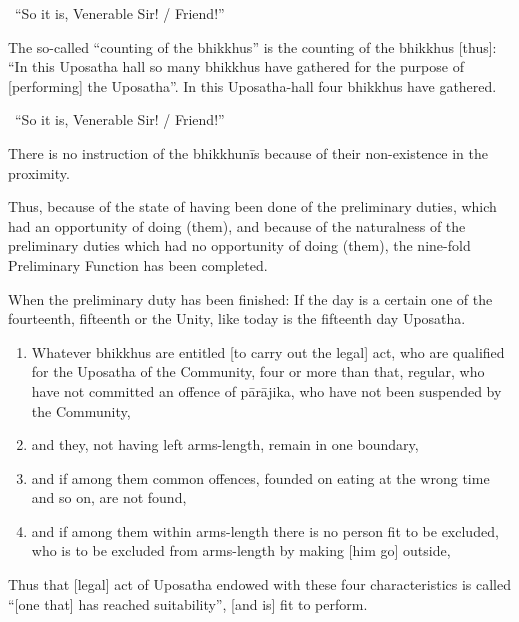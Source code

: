\begin{center}
  \anglebracketleft\ \hspace{-0.5mm}``So it is, Venerable Sir! / Friend!'' \hspace{-0.5mm}\anglebracketright\
\end{center}

The so-called ``counting of the bhikkhus'' is the counting of the bhikkhus [thus]: ``In this Uposatha hall so many bhikkhus have gathered for the purpose of [performing] the Uposatha''. In this Uposatha-hall four bhikkhus have gathered.

\begin{center}
  \anglebracketleft\ \hspace{-0.5mm}``So it is, Venerable Sir! / Friend!'' \hspace{-0.5mm}\anglebracketright\
\end{center}

There is no instruction of the bhikkhunīs because of their non-existence in the proximity.

Thus, because of the state of having been done of the preliminary duties, which had an opportunity of doing (them), and because of the naturalness of the preliminary duties which had no opportunity of doing (them), the nine-fold Preliminary Function has been completed.

When the preliminary duty has been finished: If the day is a certain one of the fourteenth, fifteenth or the Unity, like today is the fifteenth day Uposatha.

\begin{enumerate}
  \item Whatever bhikkhus are entitled [to carry out the legal] act, who are qualified for the Uposatha of the Community, four or more than that, regular, who have not committed an offence of pārājika, who have not been suspended by the Community,
  \item and they, not having left arms-length, remain in one boundary,
  \item and if among them common offences, founded on eating at the wrong time and so on, are not found,
  \item and if among them within arms-length there is no person fit to be excluded, who is to be excluded from arms-length by making [him go] outside,
\end{enumerate}
  
  Thus that [legal] act of Uposatha endowed with these four characteristics is called ``[one that] has reached suitability'', [and is] fit to perform.

